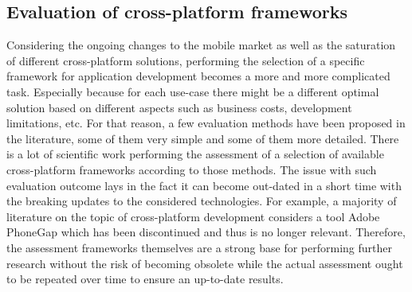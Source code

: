 
\subsection{Evaluation of cross-platform frameworks}

Considering the ongoing changes to the mobile market as well as the saturation of different cross-platform solutions, performing the selection of a specific framework for application development becomes a more and more complicated task. Especially because for each use-case there might be a different optimal solution based on different aspects such as business costs, development limitations, etc. For that reason, a few evaluation methods have been proposed in the literature, some of them very simple and some of them more detailed. There is a lot of scientific work performing the assessment of a selection of available cross-platform frameworks according to those methods. The issue with such evaluation outcome lays in the fact it can become out-dated in a short time with the breaking updates to the considered technologies. For example, a majority of literature on the topic of cross-platform development considers a tool Adobe PhoneGap which has been discontinued and thus is no longer relevant. Therefore, the assessment frameworks themselves are a strong base for performing further research  without the risk of becoming obsolete while the actual assessment ought to be repeated over time to ensure an up-to-date results.

